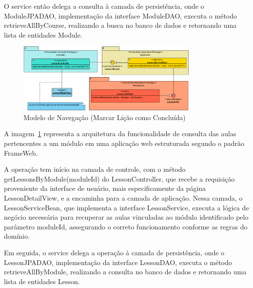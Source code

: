O \textsf{service} então delega a consulta à camada de persistência, onde o \textsf{ModuleJPADAO}, implementação da interface \textsf{ModuleDAO}, executa o método \textsf{retrieveAllByCourse}, realizando a busca no banco de dados e retornando uma lista de entidades \textsf{Module}.

\begin{figure}[h]
	\centering
	\includegraphics[width=0.8\textwidth]{figuras/marcarLicaoConcluida.png}
	\caption{Modelo de Navegação (\textsf{Marcar Lição como Concluída})}
	\label{marcarLicaoConcluida}
\end{figure}

A imagem~\ref{marcarLicaoConcluida} representa a arquitetura da funcionalidade de consulta das aulas pertencentes a um módulo em uma aplicação web estruturada segundo o padrão \textsf{FrameWeb}.

A operação tem início na camada de controle, com o método \textsf{getLessonsByModule(moduleId)} do \textsf{LessonController}, que recebe a requisição proveniente da interface de usuário, mais especificamente da página \textsf{LessonDetailView}, e a encaminha para a camada de aplicação. Nessa camada, o \textsf{LessonServiceBean}, que implementa a interface \textsf{LessonService}, executa a lógica de negócio necessária para recuperar as aulas vinculadas ao módulo identificado pelo parâmetro \textsf{moduleId}, assegurando o correto funcionamento conforme as regras do domínio.

Em seguida, o \textsf{service} delega a operação à camada de persistência, onde o \textsf{LessonJPADAO}, implementação da interface \textsf{LessonDAO}, executa o método \textsf{retrieveAllByModule}, realizando a consulta no banco de dados e retornando uma lista de entidades \textsf{Lesson}.